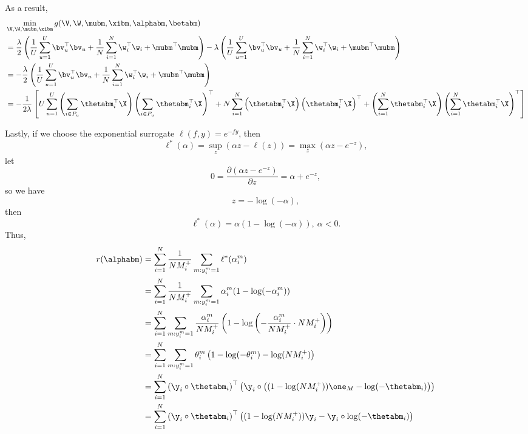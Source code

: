 As a result,
\begin{equation}
\label{eq:gmin}
\begin{aligned}
&\min_{\V, \W, \mubm, \xibm} g(\V, \W, \mubm, \xibm, \alphabm, \betabm) \\
&= \frac{\lambda}{2} \left( \frac{1}{U} \sum_{u=1}^U \bv_u^\top \bv_u 
     + \frac{1}{N} \sum_{i=1}^N \w_i^\top \w_i + \mubm^\top \mubm \right)
     -\lambda \left( \frac{1}{U} \sum_{u=1}^U \bv_u^\top \bv_u + \frac{1}{N} \sum_{i=1}^N \w_i^\top \w_i + \mubm^\top \mubm \right) \\
&= -\frac{\lambda}{2} \left( \frac{1}{U} \sum_{u=1}^U \bv_u^\top \bv_u + \frac{1}{N} \sum_{i=1}^N \w_i^\top \w_i + \mubm^\top \mubm \right) \\
&= -\frac{1}{2 \lambda} \left[
     U \sum_{u=1}^U \left( \sum_{i \in P_u} \thetabm_i^\top \X \right) \left( \sum_{i \in P_u} \thetabm_i^\top \X \right)^\top
   + N \sum_{i=1}^N \left( \thetabm_i^\top \X \right) \left( \thetabm_i^\top \X \right)^\top
   + \left( \sum_{i=1}^N \thetabm_i^\top \X \right) \left( \sum_{i=1}^N \thetabm_i^\top \X \right)^\top \right]
\end{aligned}
\end{equation}

Lastly, if we choose the exponential surrogate $\ell(f, y) = e^{-fy}$, then
\begin{equation*}
\ell^*(\alpha) = \sup_z \left(\alpha z - \ell(z) \right) = \max_z \left(\alpha z - e^{-z} \right),
\end{equation*}
let 
\begin{equation*}
0 = \frac{\partial (\alpha z - e^{-z})}{\partial z} = \alpha + e^{-z},
\end{equation*}
so we have
\begin{equation*}
z = -\log(-\alpha),
\end{equation*}
then
\begin{equation*}
\ell^*(\alpha) = \alpha ( 1 - \log(-\alpha) ), \ \alpha < 0.
\end{equation*}
Thus,
\begin{equation}
\label{eq:expconj}
\begin{aligned}
r(\alphabm)
&= \sum_{i=1}^N \frac{1}{N M_i^+} \sum_{m: y_i^m = 1} \ell^*(\alpha_i^m) \\
&= \sum_{i=1}^N \frac{1}{N M_i^+} \sum_{m: y_i^m = 1} \alpha_i^m (1 - \log(-\alpha_i^m)) \\
&= \sum_{i=1}^N \sum_{m: y_i^m = 1} \frac{\alpha_i^m}{N M_i^+} \left(1 - \log \left( -\frac{\alpha_i^m}{N M_i^+} \cdot N M_i^+ \right) \right) \\
&= \sum_{i=1}^N \sum_{m: y_i^m = 1} \theta_i^m \left(1 - \log(-\theta_i^m) - \log(N M_i^+) \right) \\
&= \sum_{i=1}^N \left( \y_i \circ \thetabm_i \right)^\top 
                \left( \y_i \circ \left( (1 - \log(N M_i^+)) \one_M - \log(-\thetabm_i) \right) \right) \\
&= \sum_{i=1}^N \left( \y_i \circ \thetabm_i \right)^\top 
                \left( (1 - \log(N M_i^+)) \y_i - \y_i \circ \log(-\thetabm_i) \right)
\end{aligned}
\end{equation}

